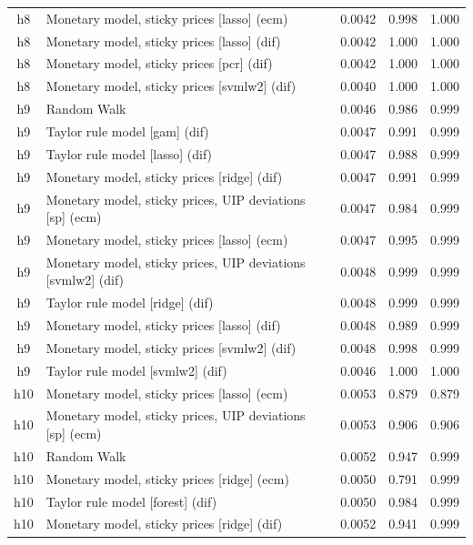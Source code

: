 \begin{ThreePartTable}
\begin{longtable}[t]{cp{5.5cm}ccc}
h8 & \raggedright Monetary model, sticky prices [lasso] (ecm) & 0.0042 & 0.998 & 1.000\\
h8 & \raggedright Monetary model, sticky prices [lasso] (dif) & 0.0042 & 1.000 & 1.000\\
h8 & \raggedright Monetary model, sticky prices [pcr] (dif) & 0.0042 & 1.000 & 1.000\\
h8 & \raggedright Monetary model, sticky prices [svmlw2] (dif) & 0.0040 & 1.000 & 1.000\\
\addlinespace
h9 & \raggedright Random Walk & 0.0046 & 0.986 & 0.999\\
h9 & \raggedright Taylor rule model [gam] (dif) & 0.0047 & 0.991 & 0.999\\
h9 & \raggedright Taylor rule model [lasso] (dif) & 0.0047 & 0.988 & 0.999\\
h9 & \raggedright Monetary model, sticky prices [ridge] (dif) & 0.0047 & 0.991 & 0.999\\
h9 & \raggedright Monetary model, sticky prices, UIP deviations [sp] (ecm) & 0.0047 & 0.984 & 0.999\\
h9 & \raggedright Monetary model, sticky prices [lasso] (ecm) & 0.0047 & 0.995 & 0.999\\
h9 & \raggedright Monetary model, sticky prices, UIP deviations [svmlw2] (dif) & 0.0048 & 0.999 & 0.999\\
h9 & \raggedright Taylor rule model [ridge] (dif) & 0.0048 & 0.999 & 0.999\\
h9 & \raggedright Monetary model, sticky prices [lasso] (dif) & 0.0048 & 0.989 & 0.999\\
h9 & \raggedright Monetary model, sticky prices [svmlw2] (dif) & 0.0048 & 0.998 & 0.999\\
h9 & \raggedright Taylor rule model [svmlw2] (dif) & 0.0046 & 1.000 & 1.000\\
\addlinespace
h10 & \raggedright Monetary model, sticky prices [lasso] (ecm) & 0.0053 & 0.879 & 0.879\\
h10 & \raggedright Monetary model, sticky prices, UIP deviations [sp] (ecm) & 0.0053 & 0.906 & 0.906\\
h10 & \raggedright Random Walk & 0.0052 & 0.947 & 0.999\\
h10 & \raggedright Monetary model, sticky prices [ridge] (ecm) & 0.0050 & 0.791 & 0.999\\
h10 & \raggedright Taylor rule model [forest] (dif) & 0.0050 & 0.984 & 0.999\\
h10 & \raggedright Monetary model, sticky prices [ridge] (dif) & 0.0052 & 0.941 & 0.999\\

\end{longtable}
\end{ThreePartTable}
